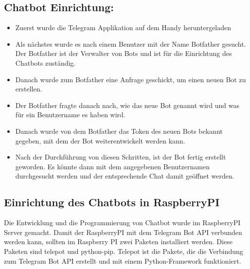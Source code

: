 \subsection{Chatbot Einrichtung:}
\begin{itemize}
	\item Zuerst wurde die Telegram Applikation auf dem Handy heruntergeladen
\end{itemize}
\begin{itemize}
	\item Als nächstes wurde es nach einem Benutzer mit der Name Botfather gesucht. Der Botfather ist der Verwalter von Bots und ist für die Einrichtung des Chatbots zuständig.
\end{itemize}
\begin{itemize}
	\item Danach wurde zum Botfather eine Anfrage geschickt, um einen neuen Bot zu erstellen. 
\end{itemize}
\begin{itemize}
	\item Der Botfather fragte danach nach, wie das neue Bot genannt wird und was für ein Benutzername es haben wird.  
\end{itemize}
\begin{itemize}
	\item Danach wurde von dem Botfather das Token des neuen Bots bekannt gegeben, mit dem der Bot weiterentwickelt werden kann. 
\end{itemize}
\begin{itemize}
	\item Nach der Durchführung von diesen Schritten, ist der Bot fertig erstellt geworden. Es könnte dann mit dem angegebenen Benutzernamen durchgesucht werden und der entsprechende Chat damit geöffnet werden. 
\end{itemize}
\subsection{Einrichtung des Chatbots in RaspberryPI}
Die Entwicklung und die Programmierung von Chatbot wurde im RaspberryPI Server gemacht. Damit der RaspberryPI mit dem Telegram Bot API verbunden werden kann, sollten im Raspberry PI zwei Paketen installiert werden. Diese Paketen sind telepot und python-pip. Telepot ist die Pakete, die die Verbindung zum Telegram Bot API erstellt und mit einem Python-Framework funktioniert.\cite{50_telegram}
